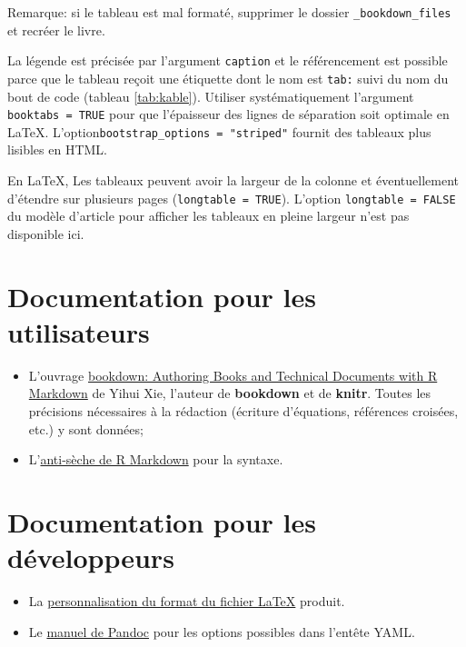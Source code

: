 \documentclass[
  11pt,
  french,
  a4paper,
  extrafontsizes,onecolumn,openright
  ]{memoir}
\begin{document}

Remarque: si le tableau est mal formaté, supprimer le dossier \texttt{\_bookdown\_files} et recréer le livre.

La légende est précisée par l'argument \texttt{caption} et le référencement est possible parce que le tableau reçoit une étiquette dont le nom est \texttt{tab:} suivi du nom du bout de code (tableau \ref{tab:kable}).
Utiliser systématiquement l'argument \texttt{booktabs\ =\ TRUE} pour que l'épaisseur des lignes de séparation soit optimale en LaTeX.
L'option\break \texttt{bootstrap\_options\ =\ "striped"} fournit des tableaux plus lisibles en HTML.

En LaTeX, Les tableaux peuvent avoir la largeur de la colonne et éventuellement d'étendre sur plusieurs pages (\texttt{longtable\ =\ TRUE}).
L'option \texttt{longtable\ =\ FALSE} du modèle d'article pour afficher les tableaux en pleine largeur n'est pas disponible ici.

\hypertarget{documentation-pour-les-utilisateurs}{%
\section{Documentation pour les utilisateurs}\label{documentation-pour-les-utilisateurs}}

\begin{itemize}
\item
  L'ouvrage \href{https://bookdown.org/yihui/bookdown/}{bookdown: Authoring Books and Technical Documents with R Markdown} de Yihui Xie, l'auteur de \textbf{bookdown} et de \textbf{knitr}. Toutes les précisions nécessaires à la rédaction (écriture d'équations, références croisées, etc.) y sont données;
\item
  L'\href{https://www.rstudio.com/wp-content/uploads/2015/02/rmarkdown-cheatsheet.pdf}{anti-sèche de R Markdown} pour la syntaxe.
\end{itemize}

\hypertarget{documentation-pour-les-duxe9veloppeurs}{%
\section{Documentation pour les développeurs}\label{documentation-pour-les-duxe9veloppeurs}}

\begin{itemize}
\item
  La \href{http://rmarkdown.rstudio.com/pdf_document_format.html\#advanced_customization}{personnalisation du format du fichier LaTeX} produit.
\item
  Le \href{https://pandoc.org/MANUAL.html}{manuel de Pandoc} pour les options possibles dans l'entête YAML.
\end{itemize}
\end{document}
